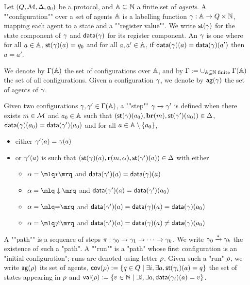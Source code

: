 \begin{definition}
	Let $(Q,\mathcal{M}, \Delta, q_0)$ be a protocol, and $\mathbb{A} \subseteq \mathbb{N}$ a finite set of \emph{agents}.
	A ""configuration"" over a set of agents $\mathbb{A}$ is a labelling function $\gamma : \mathbb{A} \to Q \times \mathbb{N}$, mapping each agent to a state and a ""register value"". We write $\mathsf{st}(\gamma)$ for the state component of $\gamma$ and $\mathsf{data}(\gamma)$ for its register component. 
	An  $\gamma$ is one where for all $a \in \mathbb{A}$, $\mathsf{st}(\gamma)(a) = q_0$ and for all $a, a' \in \mathbb{A}$, if $\mathsf{data}(\gamma)(a) = \mathsf{data}(\gamma)(a')$ then $a=a'$.
	
	\AP We denote by $\Gamma(\mathbb{A})$ the set of configurations over $\mathbb{A}$, and by $\Gamma := \cup_{\mathbb{A} \subseteq \mathbb{N} \text{ finite }} \Gamma(\mathbb{A})$ the set of all configurations. Given a configuration $\gamma$, we denote by $\mathsf{ag}(\gamma)$ the set of agents of $\gamma$.

	\AP Given two configurations $\gamma, \gamma' \in \Gamma(\mathbb{A})$, a ""step"" $\gamma \xrightarrow{} \gamma'$ is defined when there exists $m \in \mathcal{M}$ and $a_0 \in \mathbb{A}$ such that $(\mathsf{st}(\gamma)(a_0),\textbf{br}(m), \mathsf{st}(\gamma')(a_0)) \in \Delta$, $\mathsf{data}(\gamma)(a_0) = \mathsf{data}(\gamma')(a_0)$ and for all $a \in \mathbb{A}\setminus \{a_0\}$,  
	\begin{itemize}
		\item either $\gamma'(a) = \gamma(a)$
		
		\item or $\gamma'(a)$ is such that $(\mathsf{st}(\gamma)(a), \textbf{r}(m, \alpha), \mathsf{st}(\gamma')(a)) \in \Delta$ with either
		\begin{itemize}
			\item $\anact = \quotemarks{\dummyact}$ 
			and $\mathsf{data}(\gamma')(a) = \mathsf{data}(\gamma)(a)$
			\item $\anact = \quotemarks{\enregact}$ and $\mathsf{data}(\gamma')(a) = \mathsf{data}(\gamma')(a_0)$
			\item $\anact = \quotemarks{\eqtestact}$ and $\mathsf{data}(\gamma')(a) = \mathsf{data}(\gamma)(a) =\mathsf{data}(\gamma)(a_0)$
			\item $\anact = \quotemarks{\diseqtestact}$ and $\mathsf{data}(\gamma')(a) = \mathsf{data}(\gamma)(a) \ne \mathsf{data}(\gamma)(a_0)$
		\end{itemize}
	\end{itemize}

	\AP A ""path"" is a sequence of steps $\pi : \gamma_0 \xrightarrow{} \gamma_1 \xrightarrow{} \cdots \xrightarrow{} \gamma_k$. 
We write $\gamma_0 \xrightarrow{*} \gamma_k$ the existence of such a "path".
 A ""run"" is a "path" whose first configuration is an "initial configuration"; runs are denoted using letter $\rho$.  
Given such a "run" $\rho$, we write $\mathsf{ag}(\rho)$ its set of agents, $\mathsf{cov}(\rho):= \{q \in Q \mid \exists i, \exists a, \mathsf{st}(\gamma_i)(a) = q\}$ the set of states appearing in $\rho$ and $\mathsf{val}(\rho) := \{v \in \mathbb{N} \mid \exists i, \exists a, \mathsf{data}(\gamma_i)(a) = v\}$.  


\end{definition}
